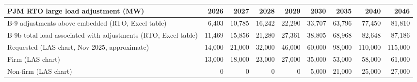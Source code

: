 \begin{tabular}{lrrrrrrrr}
\toprule
PJM RTO large load adjustment (MW) & 2026 & 2027 & 2028 & 2029 & 2030 & 2035 & 2040 & 2046 \\
\midrule
B-9 adjustments above embedded (RTO, Excel table) & 6,403 & 10,785 & 16,242 & 22,290 & 33,707 & 63,796 & 77,450 & 81,810 \\
B-9b total load associated with adjustments (RTO, Excel table) & 11,469 & 15,856 & 21,280 & 27,361 & 38,805 & 68,968 & 82,648 & 87,186 \\
Requested (LAS chart, Nov 2025, approximate) & 14,000 & 21,000 & 32,000 & 46,000 & 60,000 & 98,000 & 110,000 & 115,000 \\
Firm (LAS chart) & 13,000 & 18,000 & 23,000 & 27,000 & 35,000 & 53,000 & 58,000 & 61,000 \\
Non-firm (LAS chart) & 0 & 0 & 0 & 0 & 5,000 & 21,000 & 25,000 & 27,000 \\
\bottomrule
\end{tabular}
